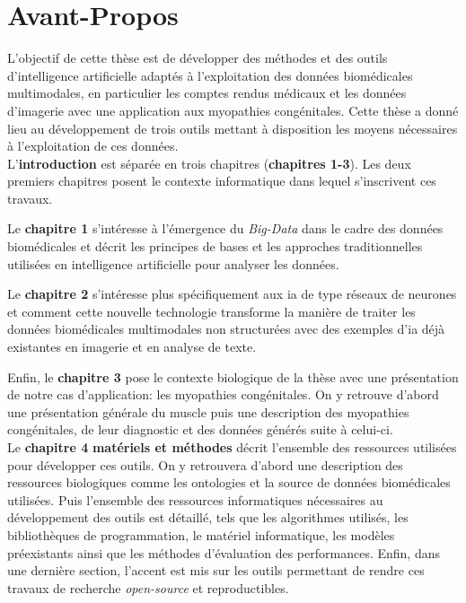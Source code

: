 \chapter{Avant-Propos}
L'objectif de cette thèse est de développer des méthodes et des outils d'intelligence artificielle adaptés à l'exploitation des données biomédicales multimodales, en particulier les comptes rendus médicaux et les données d'imagerie avec une application aux myopathies congénitales. Cette thèse a donné lieu au développement de trois outils mettant à disposition les moyens nécessaires à l'exploitation de ces données. \\


L'\textbf{introduction} est séparée en trois chapitres (\textbf{chapitres 1-3}). Les deux premiers chapitres posent le contexte informatique dans lequel s'inscrivent ces travaux. 

Le \textbf{chapitre 1} s'intéresse à l'émergence du \textit{Big-Data} dans le cadre des données biomédicales et décrit les principes de bases et les approches traditionnelles utilisées en intelligence artificielle pour analyser les données.

Le \textbf{chapitre 2} s'intéresse plus spécifiquement aux \gls{ia} de type réseaux de neurones et comment cette nouvelle technologie transforme la manière de traiter les données biomédicales multimodales non structurées avec des exemples d'\gls{ia} déjà existantes en imagerie et en analyse de texte.

Enfin, le \textbf{chapitre 3} pose le contexte biologique de la thèse avec une présentation de notre cas d'application: les myopathies congénitales. On y retrouve d'abord une présentation générale du muscle puis une description des myopathies congénitales, de leur diagnostic et des données générés suite à celui-ci. \\


Le \textbf{chapitre 4} \textbf{matériels et méthodes} décrit l'ensemble des ressources utilisées pour développer ces outils. On y retrouvera d'abord une description des ressources biologiques comme les ontologies et la source de données biomédicales utilisées. Puis l'ensemble des ressources informatiques nécessaires au développement des outils est détaillé, tels que les algorithmes utilisés, les bibliothèques de programmation, le matériel informatique, les modèles préexistants ainsi que les méthodes d'évaluation des performances. Enfin, dans une dernière section, l'accent est mis sur les outils permettant de rendre ces travaux de recherche \textit{open-source} et reproductibles. \\


